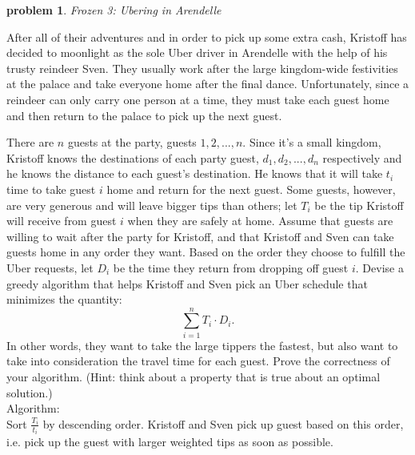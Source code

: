 \documentclass[10pt]{article}
\newtheorem{problem}{\sc\color{cit}problem}
\begin{document}
\newpage
\begin{problem}Frozen 3: Ubering in Arendelle\end{problem}

After all of their adventures and in order to pick up some extra cash, Kristoff has decided to moonlight as the sole Uber driver in Arendelle with the help of his trusty reindeer Sven.  They usually work after the large kingdom-wide festivities at the palace and take everyone home after the final dance.  Unfortunately, since a reindeer can only carry one person at a time, they must take each guest home and then return to the palace to pick up the next guest.

There are $n$ guests at the party, guests $1, 2, ..., n$.  Since it's a small kingdom, Kristoff knows the destinations of each party guest, $d_1, d_2, ..., d_n$ respectively and he knows the distance to each guest's destination.  He knows that it will take $t_i$ time to take guest $i$ home and return for the next guest.  Some guests, however, are very generous and will leave bigger tips than others; let $T_i$ be the tip Kristoff will receive from guest $i$ when they are safely at home.  Assume that guests are willing to wait after the party for Kristoff, and that Kristoff and Sven can take guests home in any order they want.  Based on the order they choose to fulfill the Uber requests, let $D_i$ be the time they return from dropping off guest $i$.  Devise a greedy algorithm that helps Kristoff and Sven pick an Uber schedule that minimizes the quantity:
\[ \sum_{i=1}^{n} T_i \cdot D_i.\]
In other words, they want to take the large tippers the fastest, but also want to take into consideration the travel time for each guest.  Prove the correctness of your algorithm.  (Hint: think about a property that is true about an optimal solution.)
\\
Algorithm:\\
Sort $\frac{T_i}{t_i}$ by descending order. Kristoff and Sven pick up guest based on this order, i.e. pick up the guest with larger weighted tips as soon as possible. \\
\end{document}
